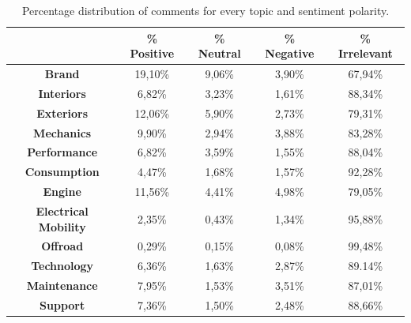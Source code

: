 \begin{table}[H]
	\renewcommand{\arraystretch}{1.3}
	\centering
	\begin{tabular}{| c | c | c | c | c |} 
		\hline
		& \textbf{\% Positive} & \textbf{\% Neutral} & \textbf{\% Negative} & \textbf{\% Irrelevant} \\ [.06cm]
		\hline
		\hline
		\textbf{Brand}& 19,10\% & 9,06\% & 3,90\% & 67,94\% \\ [.06cm]
		\hline
		\textbf{Interiors}& 6,82\% & 3,23\% & 1,61\% & 88,34\% \\ [.06cm]
		\hline
		\textbf{Exteriors}& 12,06\% & 5,90\% & 2,73\% & 79,31\%  \\ [.06cm]
		\hline
		\textbf{Mechanics}& 9,90\% & 2,94\% & 3,88\% & 83,28\% \\ [.06cm]
		\hline
		\textbf{Performance}& 6,82\% & 3,59\% & 1,55\% & 88,04\% \\ [.06cm]
		\hline
		\textbf{Consumption}& 4,47\% & 1,68\% & 1,57\% & 92,28\% \\ [.06cm]
		\hline
		\textbf{Engine}& 11,56\% & 4,41\% & 4,98\% & 79,05\% \\ [.06cm]
		\hline
		\textbf{Electrical Mobility}& 2,35\% & 0,43\% & 1,34\% & 95,88\% \\ [.06cm]
		\hline
		\textbf{Offroad}& 0,29\% & 0,15\% & 0,08\% & 99,48\% \\ [.06cm]
		\hline
		\textbf{Technology}& 6,36\% & 1,63\% & 2,87\% & 89.14\% \\ [.06cm]
		\hline
		\textbf{Maintenance}& 7,95\% & 1,53\% & 3,51\% & 87,01\% \\ [.06cm]
		\hline
		\textbf{Support}& 7,36\% & 1,50\% & 2,48\% & 88,66\% \\ [.06cm]
		\hline
		
	\end{tabular}
	\caption{Percentage distribution of comments for every topic and sentiment polarity.}
	\label{table:annotations-distribution-perc}
\end{table}


